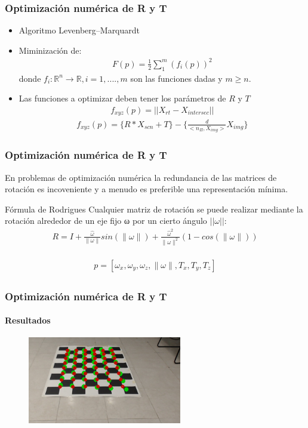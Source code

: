\documentclass[10pt, compress]{beamer}
\begin{document}
\begin{frame}[fragile]
	\frametitle{Optimización numérica de R y T }
\begin{itemize}
	 \item Algoritmo Levenberg–Marquardt
	 \item Miminización de:
 	\begin{eqnarray}
 	F(p)=\frac{1}{2}\sum\limits_1^m(f_i(p))^2	
 	\end{eqnarray}
 	donde $f_i: \mathbb{R}^n\rightarrow \mathbb{R}, i=1,....,m$ son las funciones dadas y $m\geq n$.
 	\item Las funciones a optimizar deben tener los parámetros de $R$ y $T$	
 	\begin{eqnarray}
 	f_{xyz}(p)=||X_{rt}-X_{intersec}||
 	\end{eqnarray}
 	\begin{eqnarray}
 	f_{xyz}(p)= \{R*X_{scn}+T\}-\{ \frac{d}{<n_{\Pi},X_{img}>}X_{img} \}
 	\end{eqnarray}
\end{itemize}
\end{frame}

\begin{frame}[fragile]
	\frametitle{Optimización numérica de R y T}
	En problemas de optimización numérica la redundancia de las matrices de rotación es incoveniente y a menudo es preferible una representación mínima.
	\begin{block}{Fórmula de Rodrigues}
		Cualquier matriz de rotación se puede realizar mediante la rotación
		alrededor de un eje fijo ω por un cierto ángulo $||\omega||$:
	 	\begin{eqnarray}
		 	R=I+\frac{\hat{\omega}}{\parallel\omega\parallel}sin(\parallel\omega\parallel)+ \frac{\hat{\omega}^2}{\parallel\omega\parallel^2}(1-cos(\parallel\omega\parallel))
	 	\end{eqnarray}
	\end{block}
	\begin{eqnarray}
	\begin{array}{c}
	p=[\omega_x, \omega_y, \omega_z, \parallel\omega\parallel, T_x, T_y, T_z]
	\end{array}
	\end{eqnarray}
\end{frame}
\begin{frame}[fragile]
	\frametitle{Optimización numérica de R y T}
	\framesubtitle{Resultados}
	\begin{figure}[htbp]
		\includegraphics[width=0.6\textwidth]{./pictures/conG0}
	\end{figure}	

\end{frame}
	
\end{document}
